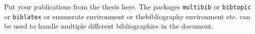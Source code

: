 \listofpublications
\noindent Put your publications from the thesis here. The packages \texttt{multibib} or \texttt{bibtopic} or \texttt{biblatex} or enumerate environment or thebibliography environment etc. can be used to handle multiple different bibliographies in the document.

